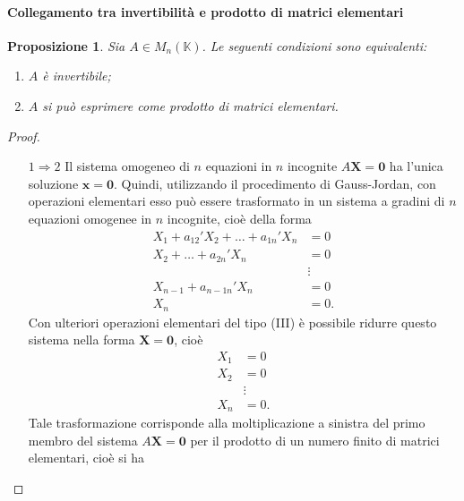\documentclass{article}
\theoremstyle{plain}
\newtheorem{prop}[thm]{Proposizione}
\theoremstyle{definition}
\theoremstyle{remark}
\begin{document}
\paragraph{Collegamento tra invertibilità e prodotto di matrici elementari}
\begin{bxthm}
\begin{prop}
    Sia \( A \in M_n(\mathbb{K}) \). Le seguenti condizioni sono equivalenti:
    \begin{enumerate}
        \item \( A \) è invertibile;
        \item \( A \) si può esprimere come prodotto di matrici elementari.
    \end{enumerate}
\end{prop}
\end{bxthm}
\begin{proof}\hfill
    \begin{itemize}
        \item[$1\Rightarrow 2$]
        Il sistema omogeneo di \( n \) equazioni in \( n \) incognite \( A\mathbf{X} = \mathbf{0} \) ha l'unica soluzione \( \mathbf{x} = \mathbf{0} \). 
        Quindi, utilizzando il procedimento di Gauss-Jordan, con operazioni elementari esso può essere trasformato in un sistema a gradini di \( n \) equazioni omogenee in \( n \) incognite, cioè della forma
        \[
            \begin{aligned}
                X_1 + a_{12}'X_2 + \ldots + a_{1n}'X_n &= 0 \\
                X_2 + \ldots + a_{2n}'X_n &= 0 \\
                &\vdots \\
                X_{n-1} + a_{n-1n}'X_n &= 0 \\
                X_n &= 0.
            \end{aligned}
        \]
        Con ulteriori operazioni elementari del tipo (III) è possibile ridurre questo sistema nella forma \( \mathbf{X} = \mathbf{0} \), cioè
        \[
            \begin{aligned}
                X_1 &= 0 \\
                X_2 &= 0 \\
                &\vdots \\
                X_n &= 0.
            \end{aligned}
        \]
        Tale trasformazione corrisponde alla moltiplicazione a sinistra del primo membro del sistema \( A\mathbf{X} = \mathbf{0} \) per il prodotto di un numero finito di matrici elementari, cioè si ha

\end{itemize}
\end{proof}
\end{document}
